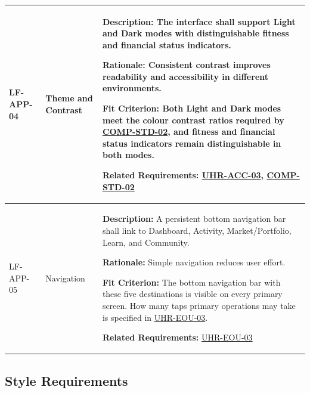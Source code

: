 \documentclass[12pt]{article}
\begin{document}
\begin{xltabular}{\textwidth}{|p{2.6cm}|p{3.4cm}|X|}
LF-APP-04\hypertarget{req:LF-APP-04}{} &
Theme and Contrast &
\textbf{Description:} The interface shall support Light and Dark modes with distinguishable fitness and financial status indicators.

\textbf{Rationale:} Consistent contrast improves readability and accessibility in different environments.

\textbf{Fit Criterion:} Both Light and Dark modes meet the colour contrast ratios required by \hyperlink{req:COMP-STD-02}{COMP-STD-02}, and fitness and financial status indicators remain distinguishable in both modes.

\textbf{Related Requirements:} \hyperlink{req:UHR-ACC-03}{UHR-ACC-03}, \hyperlink{req:COMP-STD-02}{COMP-STD-02}\\
\hline

LF-APP-05\hypertarget{req:LF-APP-05}{} &
Navigation &
\textbf{Description:} A persistent bottom navigation bar shall link to Dashboard, Activity, Market/Portfolio, Learn, and Community.

\textbf{Rationale:} Simple navigation reduces user effort.

\textbf{Fit Criterion:} The bottom navigation bar with these five destinations is visible on every primary screen. How many taps primary operations may take is specified in \hyperlink{req:UHR-EOU-03}{UHR-EOU-03}.

\textbf{Related Requirements:} \hyperlink{req:UHR-EOU-03}{UHR-EOU-03}\\
\hline

\end{xltabular}
\subsection{Style Requirements}
\end{document}
